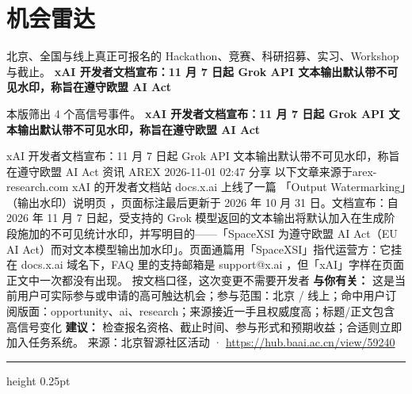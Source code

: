 \documentclass[10.5pt]{ctexart}
\begin{document}
\section*{机会雷达}
{\color{ormuted} 北京、全国与线上真正可报名的 Hackathon、竞赛、科研招募、实习、Workshop 与截止。}
\vspace{2mm}
{\LARGE\bfseries xAI 开发者文档宣布：11 月 7 日起 Grok API 文本输出默认带不可见水印，称旨在遵守欧盟 AI Act}\par
\vspace{1mm}
{\color{ormuted} 本版筛出 4 个高信号事件。}
\vspace{3mm}
{\Large\bfseries xAI 开发者文档宣布：11 月 7 日起 Grok API 文本输出默认带不可见水印，称旨在遵守欧盟 AI Act}\par
xAI 开发者文档宣布：11 月 7 日起 Grok API 文本输出默认带不可见水印，称旨在遵守欧盟 AI Act 资讯 AREX 2026-11-01 02:47 分享 以下文章来源于arex-research.com xAI 的开发者文档站 docs.x.ai 上线了一篇 「Output Watermarking」（输出水印）说明页 ，页面标注最后更新于 2026 年 10 月 31 日。文档宣布：自 2026 年 11 月 7 日起，受支持的 Grok 模型返回的文本输出将默认加入在生成阶段施加的不可见统计水印，并写明目的——「SpaceXSI 为遵守欧盟 AI Act（EU AI Act）而对文本模型输出加水印」。页面通篇用「SpaceXSI」指代运营方：它挂在 docs.x.ai 域名下，FAQ 里的支持邮箱是 support@x.ai ，但「xAI」字样在页面正文中一次都没有出现。 按文档口径，这次变更不需要开发者
\textbf{与你有关：} 这是当前用户可实际参与或申请的高可触达机会；参与范围：北京 / 线上；命中用户订阅版面：opportunity、ai、research；来源接近一手且权威度高；标题/正文包含高信号变化
\textbf{建议：} 检查报名资格、截止时间、参与形式和预期收益；合适则立即加入任务系统。
{\footnotesize\color{ormuted} 来源：北京智源社区活动 · \url{https://hub.baai.ac.cn/view/59240}}
\vspace{4mm}
\hrule height 0.25pt
\vspace{3mm}
\end{document}
